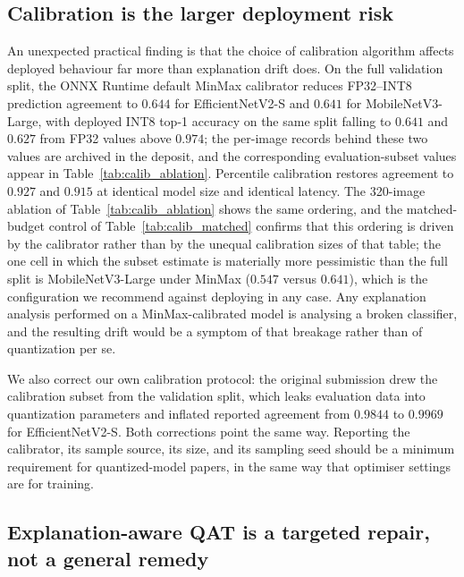 \documentclass[fleqn,10pt]{wlscirep}
\begin{document}
\subsection*{Calibration is the larger deployment risk}

An unexpected practical finding is that the choice of calibration algorithm affects deployed behaviour far more than explanation drift does. On the full validation split, the ONNX Runtime default MinMax calibrator reduces FP32--INT8 prediction agreement to $0.644$ for EfficientNetV2-S and $0.641$ for MobileNetV3-Large, with deployed INT8 top-1 accuracy on the same split falling to $0.641$ and $0.627$ from FP32 values above $0.974$; the per-image records behind these two values are archived in the deposit, and the corresponding evaluation-subset values appear in Table~\ref{tab:calib_ablation}. Percentile calibration restores agreement to $0.927$ and $0.915$ at identical model size and identical latency. The 320-image ablation of Table~\ref{tab:calib_ablation} shows the same ordering, and the matched-budget control of Table~\ref{tab:calib_matched} confirms that this ordering is driven by the calibrator rather than by the unequal calibration sizes of that table; the one cell in which the subset estimate is materially more pessimistic than the full split is MobileNetV3-Large under MinMax ($0.547$ versus $0.641$), which is the configuration we recommend against deploying in any case. Any explanation analysis performed on a MinMax-calibrated model is analysing a broken classifier, and the resulting drift would be a symptom of that breakage rather than of quantization per se.

We also correct our own calibration protocol: the original submission drew the calibration subset from the validation split, which leaks evaluation data into quantization parameters and inflated reported agreement from $0.9844$ to $0.9969$ for EfficientNetV2-S. Both corrections point the same way. Reporting the calibrator, its sample source, its size, and its sampling seed should be a minimum requirement for quantized-model papers, in the same way that optimiser settings are for training.

\subsection*{Explanation-aware QAT is a targeted repair, not a general remedy}
\end{document}
